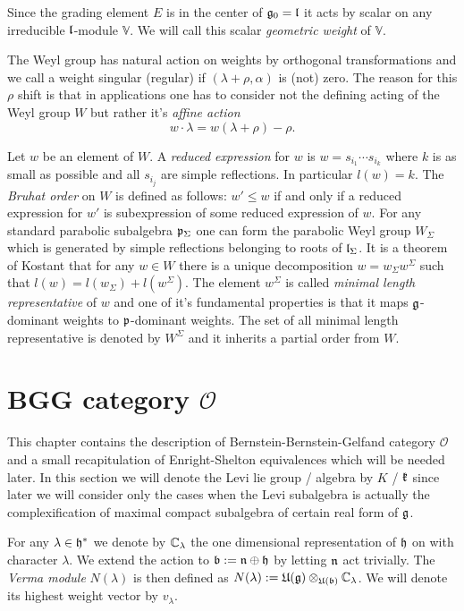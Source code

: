 Since the grading element $E$ is in the center of $\mathfrak{g}_0 = \mathfrak{l}$ it acts by scalar on any irreducible $\mathfrak{l}$-module $\mathbb{V}$. We will call this scalar \emph{geometric weight} of $\mathbb{V}$.

The Weyl group has natural action on weights by orthogonal transformations and we call a weight singular (regular) if $(\lambda + \rho, \alpha)$ is (not) zero. The reason for this $\rho$ shift is that in applications one has to consider not the defining acting of the Weyl group $W$ but rather it's \emph{affine action} 
\[
 w \cdot \lambda = w(\lambda + \rho) - \rho.
\]

Let $w$ be an element of $W$. A \emph{reduced expression} for $w$ is $w = s_{i_1} \cdots s_{i_k}$ where $k$ is as small as possible and all $s_{i_j}$ are simple reflections. In particular $l(w) = k$. The \emph{Bruhat order} on $W$ is defined as follows: $w' \leq w$ if and only if a reduced expression for $w'$ is subexpression of some reduced expression of $w.$ For any standard parabolic subalgebra $\mathfrak{p}_\Sigma$ one can form the parabolic Weyl group $W_\Sigma$ which is generated by simple reflections belonging to roots of $\mathfrak{l}_\Sigma$. It is a theorem of Kostant \cite{kostant_lie_1961} that for any $w \in W$ there is a unique decomposition $w = w_\Sigma w^\Sigma$ such that $l(w) = l(w_\Sigma) + l(w^\Sigma)$. The element $w^\Sigma$ is called \emph{minimal length representative} of $w$ and one of it's fundamental properties is that it maps $\mathfrak{g}$-dominant weights to $\mathfrak{p}$-dominant weights. The set of all minimal length representative is denoted by $W^\Sigma$ and it inherits a partial order from $W$.


\section[BGG category O]{BGG category $\mathcal{O}$}

This chapter contains the description of Bernstein-Bernstein-Gelfand category $\mathcal{O}$ and a small recapitulation of Enright-Shelton equivalences which will be needed later. In this section we will denote the Levi lie group / algebra by $K$ / $\mathfrak{k}$ since later we will consider only the cases when the Levi subalgebra is actually the complexification of maximal compact subalgebra of certain real form of $\mathfrak{g}$.

For any $\lambda\in\mathfrak{h}^*$ we denote by $\mathbb{C}_\lambda$ the one dimensional representation of $\mathfrak{h}$ on with character $\lambda$. We extend the action to $\mathfrak{b} := \mathfrak{n}\oplus\mathfrak{h}$ by letting $\mathfrak{n}$ act trivially. The \emph{Verma module} $N(\lambda)$ is then defined as $N(\lambda) := \mathfrak{U(g)}\otimes_{\mathfrak{U(b)}} \mathbb{C}_\lambda$. We will denote its highest weight vector by $v_\lambda$.

